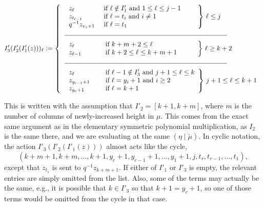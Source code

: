 \documentclass[ALCO]{cedram}
\newcommand{\etamutilde}{{(\eta \mid \widetilde{\mu})}}
\begin{document}
\[ I'_3(I'_2(I'_1(z)))_\ell := \left\{\begin{tabular}{l l} $ \left.\begin{array}{l l} z_\ell  &\text{ if } \ell\notin I'_1 \text{ and } 1\leq \ell \leq j-1 \\
z_{t_{\ell-1}} \hspace*{.5cm} &\text{ if } \ell=t_i \text{ and } i \neq 1\\
q^{-1} z_{v_s+1} &\text{ if } \ell=t_1 \\\end{array} \hspace{.7cm} \right\} \, \ell \leq j$ \\
\underline{\hspace{8.5cm}}\\[2mm] $\left.\begin{array}{l l}
z_{\ell} \hspace*{1.15cm} &\text{ if } k+m+2 \leq \ell\\
z_{\ell-1} &\text{ if } k+2 \leq \ell \leq k+m+1
\hspace*{.85cm}\, \end{array} \right\} \, \ell \geq k+2 $
\\
\underline{\hspace{8.5cm}}\\[2mm]
$\left.\begin{array}{l l} z_\ell &\text{ if } \ell -1\notin I'_3 \text{ and } j+1 \leq \ell \leq k\\
z_{y_{i-1}+1} \hspace*{0.35cm}&\text{ if } \ell=y_i+1 \text{ and } i\geq 2\\
z_{y_c+1} &\text{ if } \ell=k+1
\hspace*{0cm} \end{array} \right\} \, j+1 \leq \ell \leq k+1  $
\end{tabular}  \right.\]

This is written with the assumption that $I'_2 = [k+1,k+m]$,  where $m$ is the number of columns of newly-increased height in $\mu$. This comes from the exact same argument as in the elementary symmetric polynomial multiplication, as $I_2$ is the same there, and we are evaluating at the same $\etamutilde$. In cyclic notation, the action $I'_3(I'_2(I'_1(z)))$ almost acts like the cycle,
\[(k+m+1,k+m,\dotsc, k+1,y_c+1, y_{c-1}+1, \dotsc, y_1+1, j, t_r, t_{r-1}, \dotsc, t_1),\]
except that $z_{t_1}$ is sent to $q^{-1}z_{k+m+1}$. If either of $I'_1$ or $I'_3$ is empty, the relevant entries are simply omitted from the list. Also, some of the terms may actually be the same, e.g., it is possible that $k\in I'_3$ so that $k+1=y_c+1$, so one of those terms would be omitted from the cycle in that case.
\end{document}
